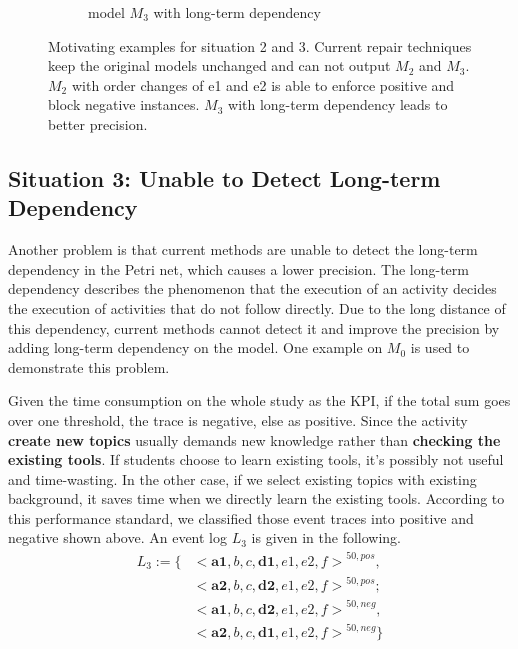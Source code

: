 \begin{figure}[htp]
\begin{subfigure}[b]{0.5\textwidth}
		\caption{model $M_{3}$ with long-term dependency}
		\label{fig:demo_s3_expected}
	\end{subfigure}
	\caption[Motivating examples for situation 2 and 3]{Motivating examples for situation 2 and 3. Current repair techniques keep the original models unchanged and can not output $M_{2}$ and $M_{3}$. $M_2$ with order changes of e1 and e2 is able to enforce positive and block negative instances. $M_{3}$ with long-term dependency leads to better precision.}
	\label{fig:model_demo_2_3}
\end{figure}
\subsection{Situation 3: \small{Unable to Detect Long-term Dependency}}
Another problem is that current methods are unable to detect the long-term dependency in the Petri net, which causes a lower precision. The long-term dependency describes the phenomenon that the execution of an activity decides the execution of activities that do not follow directly. Due to the long distance of this dependency, current methods cannot detect it and improve the precision by adding long-term dependency on the model. One example  on $M_0$ is used to demonstrate this problem.
 

Given the time consumption on the whole study as the KPI, if the total sum goes over one threshold, the trace is negative, else as positive. Since the activity \textbf{create new topics} usually demands new knowledge rather than \textbf{checking the existing tools}. If students choose to learn existing tools, it's possibly not useful and time-wasting. In the other case, if we select existing topics with existing background, it saves time when we directly learn the existing tools. According to this performance standard, we classified those event traces into positive and negative shown above.
An event log $L_3$ is given in the following. 
\begin{align*}
L_3:= \{ & { <\textbf{a1}, b, c, \textbf{d1}, e1, e2, f >}^{50, pos}, \\  
 &{<\textbf{a2}, b, c, \textbf{d2}, e1, e2, f >}^{50, pos} ; \\
& {<\textbf{a1}, b, c, \textbf{d2}, e1, e2, f >}^{50, neg}, \\
& {<\textbf{a2}, b, c, \textbf{d1}, e1, e2, f >}^{50, neg}  \}
\end{align*}

